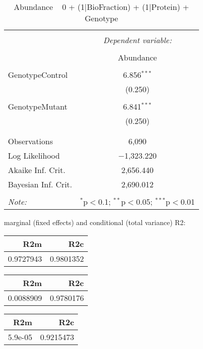 \documentclass[11pt]{report}
\begin{document}
\begin{table}[!htbp] \centering 
  \caption{Abundance ~ 0 + (1|BioFraction) + (1|Protein) + Genotype} 
  \label{} 
\begin{tabular}{@{\extracolsep{5pt}}lc} 
\\[-1.8ex]\hline 
\hline \\[-1.8ex] 
 & \multicolumn{1}{c}{\textit{Dependent variable:}} \\ 
\cline{2-2} 
\\[-1.8ex] & Abundance \\ 
\hline \\[-1.8ex] 
 GenotypeControl & 6.856$^{***}$ \\ 
  & (0.250) \\ 
  & \\ 
 GenotypeMutant & 6.841$^{***}$ \\ 
  & (0.250) \\ 
  & \\ 
\hline \\[-1.8ex] 
Observations & 6,090 \\ 
Log Likelihood & $-$1,323.220 \\ 
Akaike Inf. Crit. & 2,656.440 \\ 
Bayesian Inf. Crit. & 2,690.012 \\ 
\hline 
\hline \\[-1.8ex] 
\textit{Note:}  & \multicolumn{1}{r}{$^{*}$p$<$0.1; $^{**}$p$<$0.05; $^{***}$p$<$0.01} \\ 
\end{tabular} 
\end{table} 
marginal (fixed effects) and conditional (total variance) R2:

\begin{tabular}{r|r}
\hline
R2m & R2c\\
\hline
0.9727943 & 0.9801352\\
\hline
\end{tabular}

\begin{tabular}{r|r}
\hline
R2m & R2c\\
\hline
0.0088909 & 0.9780176\\
\hline
\end{tabular}

\begin{tabular}{r|r}
\hline
R2m & R2c\\
\hline
5.9e-05 & 0.9215473\\
\hline
\end{tabular}
\end{document}
